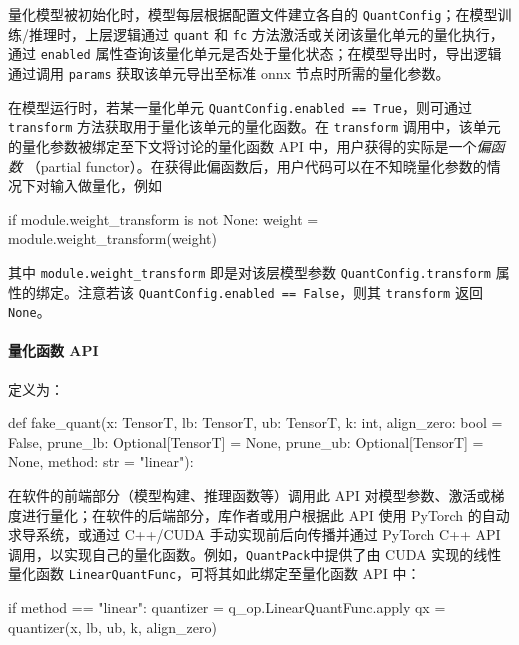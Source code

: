 \documentclass[
  fontset = source,
]{shtthesis}
\providecommand{\QP}{\texttt{QuantPack}}
\begin{document}
量化模型被初始化时，模型每层根据配置文件建立各自的 \verb|QuantConfig|；在模型训练/推理时，上层逻辑通过 \verb|quant| 和 \verb|fc| 方法激活或关闭该量化单元的量化执行，通过 \verb|enabled| 属性查询该量化单元是否处于量化状态；在模型导出时，导出逻辑通过调用 \verb|params| 获取该单元导出至标准 onnx 节点时所需的量化参数。

在模型运行时，若某一量化单元 \verb|QuantConfig.enabled == True|，则可通过 \verb|transform| 方法获取用于量化该单元的量化函数。在 \verb|transform| 调用中，该单元的量化参数被绑定至下文将讨论的量化函数 API 中，用户获得的实际是一个\emph{偏函数} （partial functor）。在获得此偏函数后，用户代码可以在不知晓量化参数的情况下对输入做量化，例如
\begin{python}
if module.weight_transform is not None:
    weight = module.weight_transform(weight)
\end{python}
其中 \verb|module.weight_transform| 即是对该层模型参数 \verb|QuantConfig.transform| 属性的绑定。注意若该 \verb|QuantConfig.enabled == False|，则其 \verb|transform| 返回 \verb|None|。
  
\paragraph{量化函数 API}
定义为：
\begin{python}
def fake_quant(x: TensorT, 
               lb: TensorT, 
               ub: TensorT, 
               k: int,
               align_zero: bool = False,
               prune_lb: Optional[TensorT] = None,
               prune_ub: Optional[TensorT] = None,
               method: str = "linear"):
\end{python}
在软件的前端部分（模型构建、推理函数等）调用此 API 对模型参数、激活或梯度进行量化；在软件的后端部分，库作者或用户根据此 API 使用 PyTorch 的自动求导系统，或通过 C++/CUDA 手动实现前后向传播并通过 PyTorch C++ API 调用，以实现自己的量化函数。例如，\QP 中提供了由 CUDA 实现的线性量化函数 \verb|LinearQuantFunc|，可将其如此绑定至量化函数 API 中：
\begin{python}
if method == "linear":
    quantizer = q_op.LinearQuantFunc.apply
    qx = quantizer(x, lb, ub, k, align_zero)
\end{python}

\end{document}
